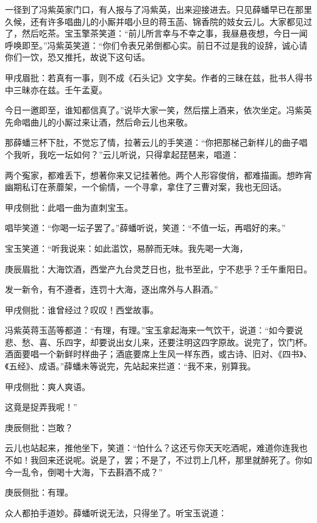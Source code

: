 \begin{parag}
    一径到了冯紫英家门口，有人报与了冯紫英，出来迎接进去。只见薛蟠早已在那里久候，还有许多唱曲儿的小厮并唱小旦的蒋玉菡、锦香院的妓女云儿。大家都见过了，然后吃茶。宝玉擎茶笑道：“前儿所言幸与不幸之事，我昼悬夜想，今日一闻呼唤即至。”冯紫英笑道：“你们令表兄弟倒都心实。前日不过是我的设辞，诚心请你们一饮，恐又推托，故说下这句话。\begin{note}甲戌眉批：若真有一事，则不成《石头记》文字矣。作者的三昧在兹，批书人得书中三昧亦在兹。壬午孟夏。\end{note}今日一邀即至，谁知都信真了。”说毕大家一笑，然后摆上酒来，依次坐定。冯紫英先命唱曲儿的小厮过来让酒，然后命云儿也来敬。
\end{parag}


\begin{parag}
    那薛蟠三杯下肚，不觉忘了情，拉著云儿的手笑道：“你把那梯己新样儿的曲子唱个我听，我吃一坛如何？”云儿听说，只得拿起琵琶来，唱道：
\end{parag}


\begin{parag}
    两个寃家，都难丢下，想著你来又记挂著他。两个人形容俊俏，都难描画。想昨宵幽期私订在荼蘼架，一个偷情，一个寻拿，拿住了三曹对案，我也无回话。\begin{note}甲戌侧批：此唱一曲为直刺宝玉。\end{note}
\end{parag}


\begin{parag}
    唱毕笑道：“你喝一坛子罢了。”薛蟠听说，笑道：“不值一坛，再唱好的来。”
\end{parag}


\begin{parag}
    宝玉笑道：“听我说来：如此滥饮，易醉而无味。我先喝一大海，\begin{note}庚辰眉批：大海饮酒，西堂产九台灵芝日也，批书至此，宁不悲乎？壬午重阳日。\end{note}发一新令，有不遵者，连罚十大海，逐出席外与人斟酒。”\begin{note}甲戌侧批：谁曾经过？叹叹！西堂故事。\end{note}冯紫英蒋玉菡等都道：“有理，有理。”宝玉拿起海来一气饮干，说道：“如今要说悲、愁、喜、乐四字，却要说出女儿来，还要注明这四字原故。说完了，饮门杯。酒面要唱一个新鲜时样曲子；酒底要席上生风一样东西，或古诗、旧对、《四书》、《五经》、成语。”薛蟠未等说完，先站起来拦道：“我不来，别算我。\begin{note}甲戌侧批：爽人爽语。\end{note}这竟是捉弄我呢！”\begin{note}庚辰侧批：岂敢？\end{note}云儿也站起来，推他坐下，笑道：“怕什么？这还亏你天天吃酒呢，难道你连我也不如！我回来还说呢。说是了，罢；不是了，不过罚上几杯，那里就醉死了。你如今一乱令，倒喝十大海，下去斟酒不成？”\begin{note}庚辰侧批：有理。\end{note}众人都拍手道妙。薛蟠听说无法，只得坐了。听宝玉说道：
\end{parag}


